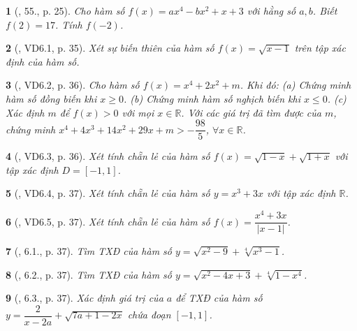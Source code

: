 \documentclass{article}
\newtheorem{baitoan}{}
\begin{document}
\begin{baitoan}[\cite{Binh_Toan_9_tap_1}, 55., p. 25]
	Cho hàm số $f(x) = ax^4 - bx^2 + x + 3$ với hằng số $a,b$. Biết $f(2) = 17$. Tính $f(-2)$.
\end{baitoan}

\begin{baitoan}[\cite{TLCT_THCS_Toan_9_dai_so}, VD6.1, p. 35]
	Xét sự biến thiên của hàm số $f(x) = \sqrt{x - 1}$ trên tập xác định của hàm số.
\end{baitoan}

\begin{baitoan}[\cite{TLCT_THCS_Toan_9_dai_so}, VD6.2, p. 36]
	Cho hàm số $f(x) = x^4 + 2x^2 + m$. Khi đó: (a) Chứng minh hàm số đồng biến khi $x\ge0$. (b) Chứng minh hàm số nghịch biến khi $x\le0$. (c) Xác định $m$ để $f(x) > 0$ với mọi $x\in\mathbb{R}$. Với các giá trị đã tìm được của $m$, chứng minh $x^4 + 4x^3 + 14x^2 + 29x + m > -\dfrac{98}{5}$, $\forall x\in\mathbb{R}$.
\end{baitoan}

\begin{baitoan}[\cite{TLCT_THCS_Toan_9_dai_so}, VD6.3, p. 36]
	Xét tính chẵn lẻ của hàm số $f(x) = \sqrt{1 - x} + \sqrt{1 + x}$ với tập xác định $D = [-1,1]$.
\end{baitoan}

\begin{baitoan}[\cite{TLCT_THCS_Toan_9_dai_so}, VD6.4, p. 37]
	Xét tính chẵn lẻ của hàm số $y = x^3 + 3x$ với tập xác định $\mathbb{R}$.
\end{baitoan}

\begin{baitoan}[\cite{TLCT_THCS_Toan_9_dai_so}, VD6.5, p. 37]
	Xét tính chẵn lẻ của hàm số $f(x) = \dfrac{x^4 + 3x}{|x - 1|}$.
\end{baitoan}

\begin{baitoan}[\cite{TLCT_THCS_Toan_9_dai_so}, 6.1., p. 37]
	Tìm {\rm TXĐ} của hàm số $y = \sqrt{x^2 - 9} + \sqrt[4]{x^3 - 1}$.
\end{baitoan}

\begin{baitoan}[\cite{TLCT_THCS_Toan_9_dai_so}, 6.2., p. 37]
	Tìm {\rm TXĐ} của hàm số $y = \sqrt{x^2 - 4x + 3} + \sqrt[4]{1 - x^4}$.
\end{baitoan}

\begin{baitoan}[\cite{TLCT_THCS_Toan_9_dai_so}, 6.3., p. 37]
	Xác định giá trị của $a$ để {\rm TXĐ} của hàm số $y = \dfrac{2}{x - 2a} + \sqrt{7a + 1 - 2x}$ chứa đoạn $[-1,1]$.
\end{baitoan}
\end{document}
